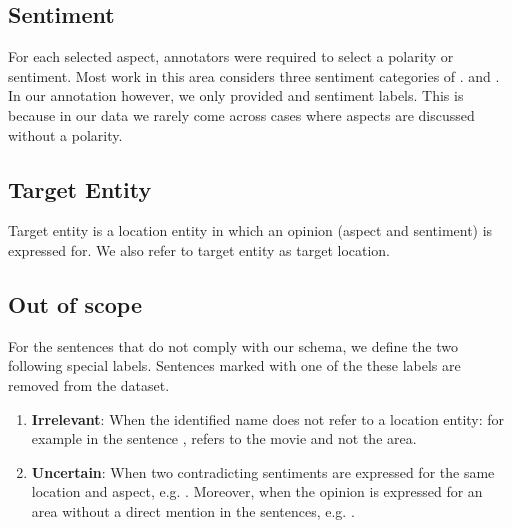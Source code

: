 \documentclass[11pt]{article}
\begin{document}
    \subsection{Sentiment}
    For each selected aspect, annotators were required to select a polarity or sentiment. Most work in this area considers three sentiment categories of .  and . In our annotation however, we only provided  and  sentiment labels. This is because in our data we rarely come across cases where aspects are discussed without a polarity. 

    \subsection{Target Entity}
    Target entity is a location entity in which an opinion (aspect and sentiment) is expressed for. We also refer to target entity as target location.  
    
    \subsection{Out of scope}
    For the sentences that do not comply with our schema, we define the two following special labels. Sentences marked with one of the these labels are removed from the dataset.
    \begin{enumerate}
    \item \textbf{Irrelevant}: When the identified name does not refer to a location entity: for example in the sentence ,  refers to the movie and not the area.
    \item \textbf{Uncertain}: When two contradicting sentiments are expressed for the same location and aspect, e.g. . Moreover, when the opinion is expressed for an area without a direct mention in the sentences, e.g. .
    \end{enumerate}
\end{document}
